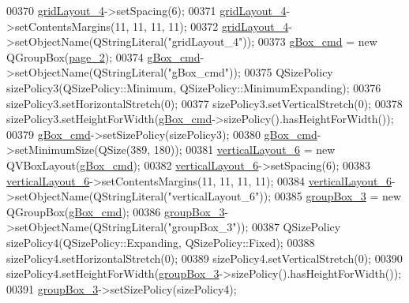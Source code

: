 \begin{DoxyCode}
00370         \hyperlink{a00027_a8ee86315639f324b17708efc7dbe8b19}{gridLayout\_4}->setSpacing(6);
00371         \hyperlink{a00027_a8ee86315639f324b17708efc7dbe8b19}{gridLayout\_4}->setContentsMargins(11, 11, 11, 11);
00372         \hyperlink{a00027_a8ee86315639f324b17708efc7dbe8b19}{gridLayout\_4}->setObjectName(QStringLiteral(\textcolor{stringliteral}{"gridLayout\_4"}));
00373         \hyperlink{a00027_ad5c6667239e28060ba3b04ee0db97bac}{gBox\_cmd} = \textcolor{keyword}{new} QGroupBox(\hyperlink{a00027_adcb6de4cebc6760fe319711f125010cc}{page\_2});
00374         \hyperlink{a00027_ad5c6667239e28060ba3b04ee0db97bac}{gBox\_cmd}->setObjectName(QStringLiteral(\textcolor{stringliteral}{"gBox\_cmd"}));
00375         QSizePolicy sizePolicy3(QSizePolicy::Minimum, QSizePolicy::MinimumExpanding);
00376         sizePolicy3.setHorizontalStretch(0);
00377         sizePolicy3.setVerticalStretch(0);
00378         sizePolicy3.setHeightForWidth(\hyperlink{a00027_ad5c6667239e28060ba3b04ee0db97bac}{gBox\_cmd}->sizePolicy().hasHeightForWidth());
00379         \hyperlink{a00027_ad5c6667239e28060ba3b04ee0db97bac}{gBox\_cmd}->setSizePolicy(sizePolicy3);
00380         \hyperlink{a00027_ad5c6667239e28060ba3b04ee0db97bac}{gBox\_cmd}->setMinimumSize(QSize(389, 180));
00381         \hyperlink{a00027_a93c190b085c63a667c535ba0bbcfec7c}{verticalLayout\_6} = \textcolor{keyword}{new} QVBoxLayout(\hyperlink{a00027_ad5c6667239e28060ba3b04ee0db97bac}{gBox\_cmd});
00382         \hyperlink{a00027_a93c190b085c63a667c535ba0bbcfec7c}{verticalLayout\_6}->setSpacing(6);
00383         \hyperlink{a00027_a93c190b085c63a667c535ba0bbcfec7c}{verticalLayout\_6}->setContentsMargins(11, 11, 11, 11);
00384         \hyperlink{a00027_a93c190b085c63a667c535ba0bbcfec7c}{verticalLayout\_6}->setObjectName(QStringLiteral(\textcolor{stringliteral}{"verticalLayout\_6"}));
00385         \hyperlink{a00027_a320d3d7ba1cb8fff7b7b95923ed10f5e}{groupBox\_3} = \textcolor{keyword}{new} QGroupBox(\hyperlink{a00027_ad5c6667239e28060ba3b04ee0db97bac}{gBox\_cmd});
00386         \hyperlink{a00027_a320d3d7ba1cb8fff7b7b95923ed10f5e}{groupBox\_3}->setObjectName(QStringLiteral(\textcolor{stringliteral}{"groupBox\_3"}));
00387         QSizePolicy sizePolicy4(QSizePolicy::Expanding, QSizePolicy::Fixed);
00388         sizePolicy4.setHorizontalStretch(0);
00389         sizePolicy4.setVerticalStretch(0);
00390         sizePolicy4.setHeightForWidth(\hyperlink{a00027_a320d3d7ba1cb8fff7b7b95923ed10f5e}{groupBox\_3}->sizePolicy().hasHeightForWidth());
00391         \hyperlink{a00027_a320d3d7ba1cb8fff7b7b95923ed10f5e}{groupBox\_3}->setSizePolicy(sizePolicy4);

\end{DoxyCode}
